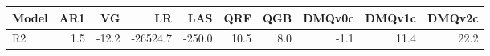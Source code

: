 \begin{tabular}{lrrrrrrrrr}
\toprule
Model & AR1 & VG & LR & LAS & QRF & QGB & DMQv0c & DMQv1c & DMQv2c \\
\midrule
R2 & 1.5 & -12.2 & -26524.7 & -250.0 & 10.5 & 8.0 & -1.1 & 11.4 & 22.2 \\
\bottomrule
\end{tabular}
